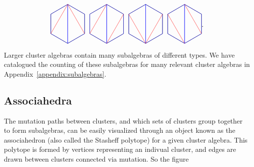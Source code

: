 \documentclass[11pt]{article}
\def\drawHexagon{
\coordinate (P1) at (90:1);
\coordinate (P2) at (30:1);
\coordinate (P3) at (330:1);
\coordinate (P4) at (270:1);
\coordinate (P5) at (210:1);
\coordinate (P6) at (150:1);
\draw (P1) -- (P2) -- (P3) -- (P4) -- (P5) -- (P6) -- cycle;
}
\begin{document}
\begin{equation}
\begin{gathered}
\begin{tikzpicture}
	\drawHexagon
  	\draw[color=blue] (P1) -- (P2) -- (P3) -- (P4) -- cycle;
  	\draw[color=blue] (P1) -- (P4) -- (P5) -- (P6) -- cycle;
  	\draw[color=red] (P1) -- (P5);
  	\draw[color=red] (P1) -- (P3);
  	\begin{scope}[xshift=2cm]
	\drawHexagon
  	\draw[color=blue] (P1) -- (P2) -- (P3) -- (P4) -- cycle;
  	\draw[color=blue] (P1) -- (P4) -- (P5) -- (P6) -- cycle;
  	\draw[color=red] (P1) -- (P5);
  	\draw[color=red] (P4) -- (P2);
	\end{scope}
	\begin{scope}[xshift=4cm]
	\drawHexagon
  	\draw[color=blue] (P1) -- (P2) -- (P3) -- (P4) -- cycle;
  	\draw[color=blue] (P1) -- (P4) -- (P5) -- (P6) -- cycle;
  	\draw[color=red] (P6) -- (P4);
  	\draw[color=red] (P4) -- (P2);
	\end{scope}
	\begin{scope}[xshift=6cm]
	\drawHexagon
  	\draw[color=blue] (P1) -- (P2) -- (P3) -- (P4) -- cycle;
  	\draw[color=blue] (P1) -- (P4) -- (P5) -- (P6) -- cycle;
  	\draw[color=red] (P6) -- (P4);
  	\draw[color=red] (P1) -- (P3);
	\end{scope}
\end{tikzpicture}
\end{gathered}.
\end{equation}
Larger cluster algebras contain many subalgebras of different types. We have catalogued the counting of these subalgebras for many relevant cluster algebras in Appendix~\ref{appendix:subalgebras}.


\subsection{Associahedra}

The mutation paths between clusters, and which sets of clusters group together to form subalgebras, can be easily visualized through an object known as the associahedron (also called the Stasheff polytope) for a given cluster algebra. This polytope is formed by vertices representing an indivual cluster, and edges are drawn between clusters connected via mutation. So the figure\\
\end{document}

